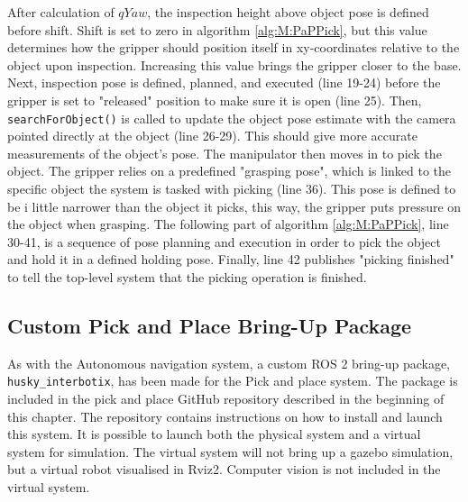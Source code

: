 After calculation of $qYaw$, the inspection height above object pose is defined before shift. Shift is set to zero in algorithm \ref{alg:M:PaPPick}, but this value determines how the gripper should position itself in xy-coordinates relative to the object upon inspection. Increasing this value brings the gripper closer to the base. Next, inspection pose is defined, planned, and executed (line 19-24) before the gripper is set to "released" position to make sure it is open (line 25). Then, \lstinline{searchForObject()} is called to update the object pose estimate with the camera pointed directly at the object (line 26-29). This should give more accurate measurements of the object's pose.  The manipulator then moves in to pick the object. The gripper relies on a predefined "grasping pose", which is linked to the specific object the system is tasked with picking (line 36). This pose is defined to be i little narrower than the object it picks, this way, the gripper puts pressure on the object when grasping. The following part of algorithm \ref{alg:M:PaPPick}, line 30-41, is a sequence of pose planning and execution in order to pick the object and hold it in a defined holding pose. Finally, line 42 publishes "picking finished" to tell the top-level system that the picking operation is finished.

\FloatBarrier
\subsection{Custom Pick and Place Bring-Up Package} \label{sec:M:PAP:CutsomPAPBringup}
As with the Autonomous navigation system, a custom ROS 2 bring-up package, \lstinline{husky_interbotix}, has been made for the Pick and place system. The package is included in the pick and place GitHub repository described in the beginning of this chapter. The repository contains instructions on how to install and launch this system. It is possible to launch both the physical system and a virtual system for simulation. The virtual system will not bring up a gazebo simulation, but a virtual robot visualised in Rviz2. Computer vision is not included in the virtual system.


